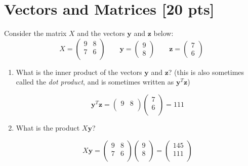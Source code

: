 \documentclass[a4paper]{article}
\theoremstyle{definition}
\newenvironment{soln}{
    \leavevmode\color{blue}\ignorespaces
}{}
\begin{document}
\section{Vectors and Matrices [20 pts]}
Consider the matrix $X$ and the vectors $\mathbf{y}$ and $\textbf{z}$ below:
$$
X = \begin{pmatrix}
9 & 8 \\ 7 & 6 \\
\end{pmatrix}
\qquad \mathbf{y} = \begin{pmatrix}
9 \\ 8
\end{pmatrix} \qquad \mathbf{z} = \begin{pmatrix}
7 \\ 6
\end{pmatrix}
$$
\begin{enumerate}
	\item 	What is the inner product of the vectors $\mathbf{y}$ and $\mathbf{z}$? (this is also sometimes called the \emph{dot product}, and is sometimes written as $\mathbf{y}^T\mathbf{z}$)\\
	    \begin{soln} 
	    $$
	    \mathbf{y}^T\mathbf{z} = \begin{pmatrix}
	    9 & 8 \\
	    \end{pmatrix}
	    \begin{pmatrix}
	    7 \\
	    6 \\
	    \end{pmatrix}
	    = 111
	    $$
	    \end{soln}
	\item 	What is the product $X\mathbf{y}$?\\
	    \begin{soln}
	    $$
	    X\mathbf{y} = \begin{pmatrix}
	    9 & 8 \\ 
	    7 & 6 \\
	    \end{pmatrix}
	     \begin{pmatrix}
	    9 \\
	    8 \\
	    \end{pmatrix}
	    = \begin{pmatrix}
	    145 \\
	    111 \\
	    \end{pmatrix}
$$
\end{soln}
\end{enumerate}
\end{document}
